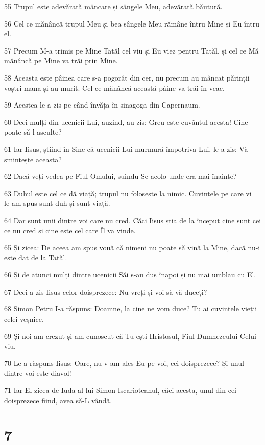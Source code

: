 \par 55 Trupul este adevărată mâncare și sângele Meu, adevărată băutură.
\par 56 Cel ce mănâncă trupul Meu și bea sângele Meu rămâne întru Mine și Eu întru el.
\par 57 Precum M-a trimis pe Mine Tatăl cel viu și Eu viez pentru Tatăl, și cel ce Mă mănâncă pe Mine va trăi prin Mine.
\par 58 Aceasta este pâinea care s-a pogorât din cer, nu precum au mâncat părinții voștri mana și au murit. Cel ce mănâncă această pâine va trăi în veac.
\par 59 Acestea le-a zis pe când învăța în sinagoga din Capernaum.
\par 60 Deci mulți din ucenicii Lui, auzind, au zis: Greu este cuvântul acesta! Cine poate să-l asculte?
\par 61 Iar Iisus, știind în Sine că ucenicii Lui murmură împotriva Lui, le-a zis: Vă smintește aceasta?
\par 62 Dacă veți vedea pe Fiul Omului, suindu-Se acolo unde era mai înainte?
\par 63 Duhul este cel ce dă viață; trupul nu folosește la nimic. Cuvintele pe care vi le-am spus sunt duh și sunt viață.
\par 64 Dar sunt unii dintre voi care nu cred. Căci Iisus știa de la început cine sunt cei ce nu cred și cine este cel care Îl va vinde.
\par 65 Și zicea: De aceea am spus vouă că nimeni nu poate să vină la Mine, dacă nu-i este dat de la Tatăl.
\par 66 Și de atunci mulți dintre ucenicii Săi s-au dus înapoi și nu mai umblau cu El.
\par 67 Deci a zis Iisus celor doisprezece: Nu vreți și voi să vă duceți?
\par 68 Simon Petru I-a răspuns: Doamne, la cine ne vom duce? Tu ai cuvintele vieții celei veșnice.
\par 69 Și noi am crezut și am cunoscut că Tu ești Hristosul, Fiul Dumnezeului Celui viu.
\par 70 Le-a răspuns Iisus: Oare, nu v-am ales Eu pe voi, cei doisprezece? Și unul dintre voi este diavol!
\par 71 Iar El zicea de Iuda al lui Simon Iscarioteanul, căci acesta, unul din cei doisprezece fiind, avea să-L vândă.

\chapter{7}

